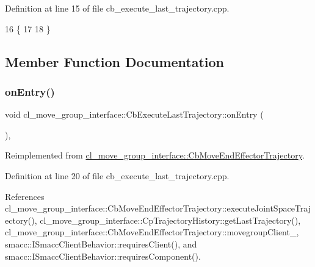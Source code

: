 Definition at line 15 of file cb\+\_\+execute\+\_\+last\+\_\+trajectory.\+cpp.


\begin{DoxyCode}
16     \{
17 
18     \}
\end{DoxyCode}


\subsection{Member Function Documentation}
\mbox{\label{classcl__move__group__interface_1_1CbExecuteLastTrajectory_ac78713663c39635ca5ac9a749503e800}} 
\subsubsection{\texorpdfstring{on\+Entry()}{onEntry()}}
{\footnotesize\ttfamily void cl\+\_\+move\+\_\+group\+\_\+interface\+::\+Cb\+Execute\+Last\+Trajectory\+::on\+Entry (\begin{DoxyParamCaption}{ }\end{DoxyParamCaption})\hspace{0.3cm}{\ttfamily [override]}, {\ttfamily [virtual]}}



Reimplemented from \hyperlink{classcl__move__group__interface_1_1CbMoveEndEffectorTrajectory_aaedd074fd178c6390a4a3f1ccff23ad3}{cl\+\_\+move\+\_\+group\+\_\+interface\+::\+Cb\+Move\+End\+Effector\+Trajectory}.



Definition at line 20 of file cb\+\_\+execute\+\_\+last\+\_\+trajectory.\+cpp.



References cl\+\_\+move\+\_\+group\+\_\+interface\+::\+Cb\+Move\+End\+Effector\+Trajectory\+::execute\+Joint\+Space\+Trajectory(), cl\+\_\+move\+\_\+group\+\_\+interface\+::\+Cp\+Trajectory\+History\+::get\+Last\+Trajectory(), cl\+\_\+move\+\_\+group\+\_\+interface\+::\+Cb\+Move\+End\+Effector\+Trajectory\+::movegroup\+Client\+\_\+, smacc\+::\+I\+Smacc\+Client\+Behavior\+::requires\+Client(), and smacc\+::\+I\+Smacc\+Client\+Behavior\+::requires\+Component().


